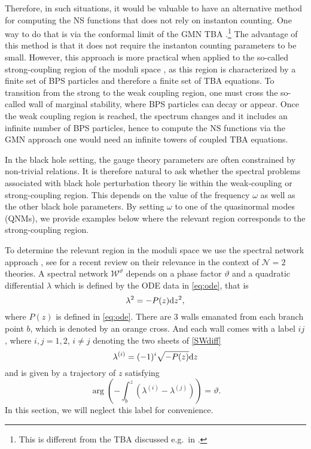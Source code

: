 \documentclass[11pt]{article}
\numberwithin{equation}{section}
\newcommand{\cW}{\ensuremath{\mathcal W}}
\newcommand{\rd}{{\rm d}}
\begin{document}
Therefore, in such situations, it would be valuable to have an alternative method for computing the NS functions 
%
that does not rely on instanton counting. One way to do that is via
 the conformal limit of the GMN TBA \cite{Gaiotto:2009hg,Gaiotto:2014bza,Hollands:2017ahy,Hollands:2013qza,Hollands:2019wbr,Grassi:2019coc,Grassi:2021wpw,Imaizumi:2021cxf}.\footnote{This is different from the TBA discussed e.g.~in \cite{post-zamo,Fioravanti:2021dce}.}
 The advantage of this method is that it does not require the instanton counting parameters to be small.  However, this approach is more practical when applied to the so-called strong-coupling region of the moduli space \cite{seiberg1994, fb, selfdual}, as this region is characterized by a finite set of BPS particles and therefore a finite set of TBA equations. 
To transition from the strong to the weak coupling region, one must cross the so-called wall of marginal stability, where BPS particles can decay or appear. Once the weak coupling region is reached, the spectrum changes and it includes an infinite number of BPS particles, hence to compute the NS functions via the GMN approach one would need an infinite towers of coupled TBA equations.

%

In the black hole setting, the gauge theory parameters are often constrained by non-trivial relations. It is therefore natural to ask whether the spectral problems associated with black hole perturbation theory lie within the weak-coupling or strong-coupling region. This  depends on the value of the frequency  $\omega$ as well as the other black hole parameters. By setting $\omega$ to  one of the quasinormal modes (QNMs), we provide examples below where the relevant region corresponds to the strong-coupling region.



To determine the relevant region in the moduli space we use the spectral network approach \cite{Gaiotto:2012rg}, see  \cite{Hollands:2021itj} for a recent review on their relevance in the context of  $\mathcal{N}=2$ theories.
%
A spectral network $\cW^\vartheta$ depends on a phase factor $\vartheta$ and a quadratic differential $\lambda$  which is defined by the ODE data in \eqref{eq:ode}, that is
\begin{equation}\label{SWdiff}
    \lambda^2=-P(z)\rd z^2,
\end{equation}
where $P(z)$ is defined in \eqref{eq:ode}. There are 3 walls emanated from each branch point $b$, which is denoted by an orange cross. And each wall comes with a label $ij$, where $i,j=1,2$, $i\neq j$ denoting the two sheets of \eqref{SWdiff}
\begin{equation}
    \lambda^{(i)}=(-1)^i\sqrt{-P(z)}\rd z
\end{equation}
and is given by a trajectory of $z$ satisfying
\begin{equation}
    \arg\left(-\int_{b}^z \left(\lambda^{(i)}-\lambda^{(j)}\right) \right)=\vartheta.
\end{equation}
In this section, we will neglect this label for convenience.
\end{document}
